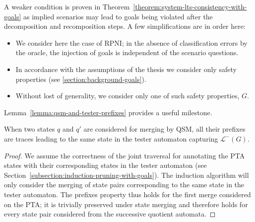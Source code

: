 A weaker condition is proven in Theorem~\ref{theorem:system-lts-consistency-with-goals} as implied scenarios may lead to goals being violated after the decomposition and recomposition steps. A few simplifications are in order here:
\begin{itemize}
\item We consider here the case of RPNI; in the absence of classification errors by the oracle, the injection of goals is independent of the scenario questions. 
\item In accordance with the assumptions of the thesis we consider only safety properties (see \ref{section:background-goals}).
\item Without lost of generality, we consider only one of such safety properties, $G$. 
\end{itemize}

Lemma~\ref{lemma:qsm-and-tester-prefixes} provides a useful milestone.

\begin{lemma}
When two states $q$ and $q'$ are considered for merging by QSM, all their prefixes are traces leading to the same state in the tester automaton capturing $\mathcal{L}^-(G)$.\label{lemma:qsm-and-tester-prefixes}
\begin{proof}
We assume the correctness of the joint traversal for annotating the PTA states with their corresponding states in the tester automaton (see Section~\ref{subsection:induction-pruning-with-goals}). The induction algorithm will only consider the merging of state pairs corresponding to the same state in the tester automaton. The prefixes property thus holds for the first merge considered on the PTA; it is trivially preserved under state merging and therefore holds for every state pair considered from the successive quotient automata.
\end{proof}
\end{lemma}

